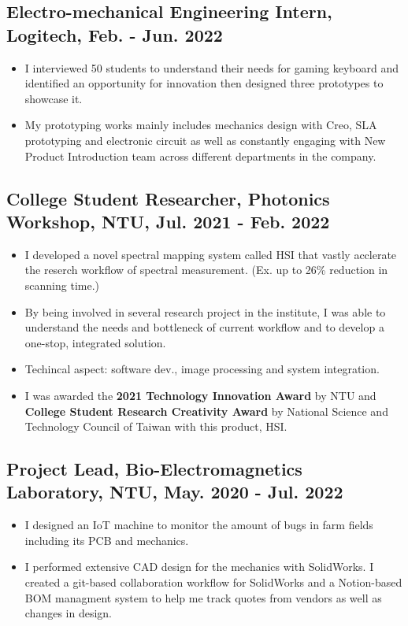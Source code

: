 \documentclass[12pt]{article}
\begin{document}
        \subsection*{Electro-mechanical Engineering Intern, Logitech, Feb. - Jun. 2022}
        {\sffamily
        \begin{itemize}
            \item I interviewed 50 students to understand their needs for gaming keyboard and identified an opportunity for innovation then designed three prototypes to showcase it.
            \item My prototyping works mainly includes mechanics design with Creo, SLA prototyping and electronic circuit as well as constantly engaging with New Product Introduction team across different departments in the company.
        \end{itemize}
        }
        \subsection*{College Student Researcher, Photonics Workshop, NTU, Jul. 2021 - Feb. 2022}
        {\sffamily
        \begin{itemize}
            \item I developed a novel spectral mapping system called HSI that vastly acclerate the reserch workflow of spectral measurement. (Ex. up to 26\% reduction in scanning time.)
            \item By being involved in several research project in the institute, I was able to understand the needs and bottleneck of current workflow and to develop a one-stop, integrated solution. 
            \item Techincal aspect: software dev., image processing and system integration. 
            \item I was awarded the \textbf{2021 Technology Innovation Award} by NTU and \textbf{College Student Research Creativity Award} by National Science and Technology Council of Taiwan with this product, HSI.
        \end{itemize}}
        \subsection*{Project Lead, Bio-Electromagnetics Laboratory, NTU, May. 2020 - Jul. 2022}
        {\sffamily
        \begin{itemize}
            \item I designed an IoT machine to monitor the amount of bugs in farm fields including its PCB and mechanics.
            \item I performed extensive CAD design for the mechanics with SolidWorks. I created a git-based collaboration workflow for SolidWorks and a Notion-based BOM managment system to help me track quotes from vendors as well as changes in design.
        \end{itemize}
        }
\end{document}
